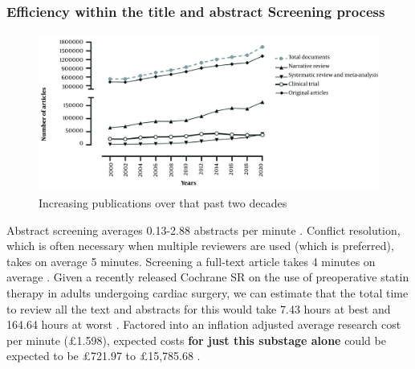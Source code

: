 \documentclass[../main.tex]{subfiles}
\begin{document}


\subsubsection{Efficiency within the title and abstract Screening process}



\begin{figure}
    \centering
    \includegraphics[width=0.8\linewidth]{sections//images/increase_in_publications.jpg}
    \caption{Increasing publications over that past two decades \cite{ghasemi_scientific_2022}}
    \label{fig:increasing_publications_over_time}
\end{figure}

Abstract screening averages 0.13-2.88 abstracts per minute \cite{shemilt_use_2016, giummarra_evaluation_2020, felizardo_visual_2013}. Conflict resolution, which is often necessary when multiple reviewers are used (which is preferred), takes on average 5 minutes. Screening a full-text article takes 4 minutes on average \cite{shemilt_use_2016}. Given a recently released Cochrane SR on the use of preoperative statin therapy in adults undergoing cardiac surgery, we can estimate that the total time to review all the text and abstracts for this would take 7.43 hours at best and 164.64 hours at worst \cite{antunes_preoperative_nodate}. Factored into an inflation adjusted average research cost per minute (£1.598), expected costs \textbf{for just this substage alone} could be expected to be £721.97 to £15,785.68 \cite{nussbaumer-streit_resource_2021}.
\end{document}
